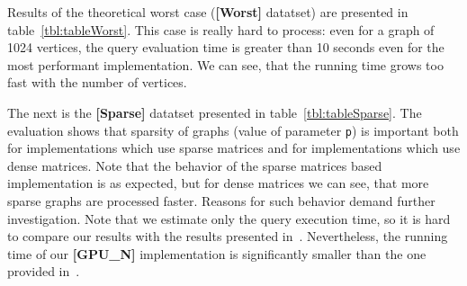Results of the theoretical worst case (\textbf{[Worst]} datatset) are presented in table~\ref{tbl:tableWorst}.
This case is really hard to process: even for a graph of 1024 vertices, the query evaluation time is greater than 10 seconds even for the most performant implementation.
We can see, that the running time grows too fast with the number of vertices.

%
%
The next is the \textbf{[Sparse]} datatset presented in table~\ref{tbl:tableSparse}.
The evaluation shows that sparsity of graphs (value of parameter \texttt{p}) is important both for implementations which use sparse matrices and for implementations which use dense matrices.
Note that the behavior of the sparse matrices based implementation is as expected, but for dense matrices we can see, that more sparse graphs are processed faster.
Reasons for such behavior demand further investigation.
Note that we estimate only the query execution time, so it is hard to compare our results with the results presented in~\cite{fan2018scaling}.
Nevertheless, the running time of our \textbf{[GPU\_N]} implementation is significantly smaller than the one provided in~\cite{fan2018scaling}.

